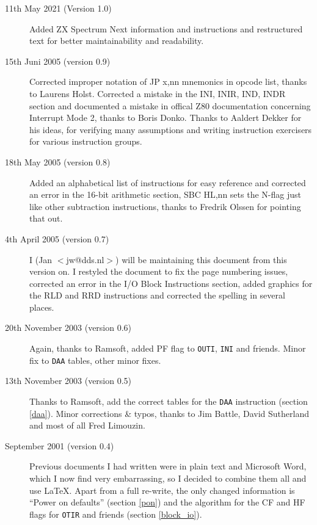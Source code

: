 \documentclass[12pt,twoside,openright,a4paper]{book}
\begin{document}
\begin{description}

	\item[11th May 2021 (Version 1.0)]
	Added ZX Spectrum Next information and instructions and restructured text for better maintainability and readability.

	\item[15th Juni 2005 (version 0.9)]
	Corrected improper notation of JP x,nn mnemonics in opcode list, thanks to Laurens Holst. Corrected a mistake in the INI, INIR, IND, INDR section and documented a mistake in offical Z80 documentation concerning Interrupt Mode 2, thanks to Boris Donko. Thanks to Aaldert Dekker for his ideas, for verifying many assumptions and writing instruction exercisers for various instruction groups.

	\item[18th May 2005 (version 0.8)]
	Added an alphabetical list of instructions for easy reference and corrected an error in the 16-bit arithmetic section, SBC HL,nn sets the N-flag just like other subtraction instructions, thanks to Fredrik Olssen for pointing that out.

	\item[4th April 2005 (version 0.7)]
	I (Jan $<$jw@dds.nl$>$) will be maintaining this document from this version on. I restyled the document to fix the page numbering issues, corrected an error in the I/O Block Instructions section, added graphics for the RLD and RRD instructions and corrected the spelling in several places.

	\item[20th November 2003 (version 0.6)]
	Again, thanks to Ramsoft, added PF flag to {\tt OUTI}, {\tt INI} and friends. Minor fix to {\tt DAA} tables, other minor fixes.

	\item[13th November 2003 (version 0.5)]
	Thanks to Ramsoft, add the correct tables for the {\tt DAA} instruction (section \ref{daa}). Minor corrections \& typos, thanks to Jim Battle, David Sutherland and most of all Fred Limouzin.

	\item[September 2001 (version 0.4)]
	Previous documents I had written were in plain text and Microsoft Word, which I now find very embarrassing, so I decided to combine them all and use {\LaTeX}. Apart from a full re-write, the only changed information is ``Power on defaults'' (section \ref{pon}) and the algorithm for the CF and HF flags for {\tt OTIR} and friends (section \ref{block_io}).

\end{description}
\end{document}
